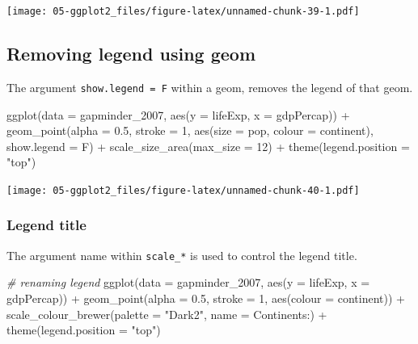 \documentclass[
]{book}
\newenvironment{Shaded}{\begin{snugshade}}{\end{snugshade}}
\newcommand{\AttributeTok}[1]{\textcolor[rgb]{0.77,0.63,0.00}{#1}}
\newcommand{\CommentTok}[1]{\textcolor[rgb]{0.56,0.35,0.01}{\textit{#1}}}
\newcommand{\DecValTok}[1]{\textcolor[rgb]{0.00,0.00,0.81}{#1}}
\newcommand{\FloatTok}[1]{\textcolor[rgb]{0.00,0.00,0.81}{#1}}
\newcommand{\FunctionTok}[1]{\textcolor[rgb]{0.00,0.00,0.00}{#1}}
\newcommand{\NormalTok}[1]{#1}
\newcommand{\SpecialCharTok}[1]{\textcolor[rgb]{0.00,0.00,0.00}{#1}}
\newcommand{\StringTok}[1]{\textcolor[rgb]{0.31,0.60,0.02}{#1}}
\begin{document}
\texttt{[image: 05-ggplot2\_files/figure-latex/unnamed-chunk-39-1.pdf]}

\hypertarget{removing-legend-using-geom}{%
\subsection{Removing legend using geom}\label{removing-legend-using-geom}}

The argument \texttt{show.legend\ =\ F} within a geom, removes the legend of that geom.

\begin{Shaded}
\begin{Highlighting}[]
\FunctionTok{ggplot}\NormalTok{(}\AttributeTok{data =}\NormalTok{ gapminder\_2007, }\FunctionTok{aes}\NormalTok{(}\AttributeTok{y =}\NormalTok{ lifeExp, }\AttributeTok{x =}\NormalTok{ gdpPercap)) }\SpecialCharTok{+} 
  \FunctionTok{geom\_point}\NormalTok{(}\AttributeTok{alpha =} \FloatTok{0.5}\NormalTok{, }\AttributeTok{stroke =} \DecValTok{1}\NormalTok{, }\FunctionTok{aes}\NormalTok{(}\AttributeTok{size =}\NormalTok{ pop, }\AttributeTok{colour =}\NormalTok{ continent), }\AttributeTok{show.legend =}\NormalTok{ F) }\SpecialCharTok{+}
  \FunctionTok{scale\_size\_area}\NormalTok{(}\AttributeTok{max\_size =} \DecValTok{12}\NormalTok{) }\SpecialCharTok{+}
  \FunctionTok{theme}\NormalTok{(}\AttributeTok{legend.position =} \StringTok{"top"}\NormalTok{)}
\end{Highlighting}
\end{Shaded}

\texttt{[image: 05-ggplot2\_files/figure-latex/unnamed-chunk-40-1.pdf]}

\hypertarget{legend-title}{%
\subsubsection{Legend title}\label{legend-title}}

The argument name within \texttt{scale\_*} is used to control the legend title.

\begin{Shaded}
\begin{Highlighting}[]
\CommentTok{\# renaming legend}
\FunctionTok{ggplot}\NormalTok{(}\AttributeTok{data =}\NormalTok{ gapminder\_2007, }\FunctionTok{aes}\NormalTok{(}\AttributeTok{y =}\NormalTok{ lifeExp, }\AttributeTok{x =}\NormalTok{ gdpPercap)) }\SpecialCharTok{+} 
  \FunctionTok{geom\_point}\NormalTok{(}\AttributeTok{alpha =} \FloatTok{0.5}\NormalTok{, }\AttributeTok{stroke =} \DecValTok{1}\NormalTok{, }\FunctionTok{aes}\NormalTok{(}\AttributeTok{colour =}\NormalTok{ continent)) }\SpecialCharTok{+}
  \FunctionTok{scale\_colour\_brewer}\NormalTok{(}\AttributeTok{palette =} \StringTok{"Dark2"}\NormalTok{, }\AttributeTok{name =} \StringTok{\textquotesingle{}Continents:\textquotesingle{}}\NormalTok{) }\SpecialCharTok{+}
  \FunctionTok{theme}\NormalTok{(}\AttributeTok{legend.position =} \StringTok{"top"}\NormalTok{)}
\end{Highlighting}
\end{Shaded}
\end{document}
